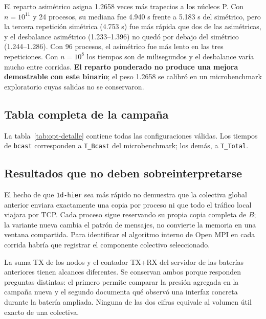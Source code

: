 \begin{table}[htbp]
\caption{Trapecio simétrico y asimétrico, tres repeticiones por Ethernet. \emph{Desb.} es el cociente $T_{CalcMax}/T_{CalcMin}$ impreso en cada log.}\label{tab:trap-reps}

\end{table}

El reparto asimétrico asigna 1.2658 veces más trapecios a los núcleos P. Con $n=10^{11}$ y 24 procesos, su mediana fue 4.940 s frente a 5.183 s del simétrico, pero la tercera repetición simétrica (4.753 s) fue más rápida que dos de las asimétricas, y el desbalance asimétrico (1.233--1.396) no quedó por debajo del simétrico (1.244--1.286). Con 96 procesos, el asimétrico fue más lento en las tres repeticiones. Con $n=10^8$ los tiempos son de milisegundos y el desbalance varía mucho entre corridas. \textbf{El reparto ponderado no produce una mejora demostrable con este binario}; el peso 1.2658 se calibró en un microbenchmark exploratorio cuyas salidas no se conservaron.

\subsection{Tabla completa de la campaña}

La tabla~\ref{tab:opt-detalle} contiene todas las configuraciones válidas. Los tiempos de \texttt{bcast} corresponden a \texttt{T\_Bcast} del microbenchmark; los demás, a \texttt{T\_Total}.

\begin{landscape}\footnotesize\renewcommand{\arraystretch}{1.0}

\end{landscape}

\subsection{Resultados que no deben sobreinterpretarse}

El hecho de que \texttt{1d-hier} sea más rápido no demuestra que la colectiva global anterior enviara exactamente una copia por proceso ni que todo el tráfico local viajara por TCP. Cada proceso sigue reservando su propia copia completa de $B$; la variante nueva cambia el patrón de mensajes, no convierte la memoria en una ventana compartida. Para identificar el algoritmo interno de Open MPI en cada corrida habría que registrar el componente colectivo seleccionado.

La suma TX de los nodos y el contador TX+RX del servidor de las baterías anteriores tienen alcances diferentes. Se conservan ambos porque responden preguntas distintas: el primero permite comparar la presión agregada en la campaña nueva y el segundo documenta qué observó una interfaz concreta durante la batería ampliada. Ninguna de las dos cifras equivale al volumen útil exacto de una colectiva.

